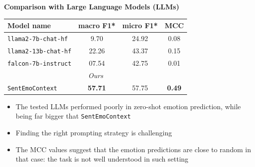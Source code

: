 \documentclass[final,hyperref={pdfpagelabels=false},unknownkeysallowed]{beamer} %
\begin{document}
\begin{frame}
\begin{minipage}{\textwidth}
  \begin{block}{\textbf{Comparison with Large Language Models (LLMs)}}
  \begin{minipage}{0.4\textwidth}
    \vspace{1ex}
    \begin{table}[!ht]
      \centering
      \begin{tabular}{@{}lccc@{}}
      \toprule
      \textbf{Model name}         &\textbf{ macro F1*} & \textbf{micro F1*} & \textbf{MCC} \\ \midrule
      \texttt{llama2-7b-chat-hf}  &  9.70  &  24.92     &  0.08   \\
      \texttt{llama2-13b-chat-hf} &  22.26   &   43.37  &  0.15   \\
      \texttt{falcon-7b-instruct} &  07.54   &  42.75  &  0.01 \\ 
      \midrule
      \multicolumn{4}{c}{\textit{Ours}}\\ \midrule
      \texttt{SentEmoContext}                                          &  \textbf{57.71}       &  57.75            & \textbf{0.49}\\
      \bottomrule
      \end{tabular}
      \end{table}
  \end{minipage}
  \begin{minipage}{0.55\textwidth}
      \begin{itemize}
        \item \enspace The tested LLMs performed poorly in zero-shot emotion prediction, while being far bigger that \texttt{SentEmoContext}
        \item \enspace Finding the right prompting strategy is challenging
        \item \enspace The MCC values suggest that the emotion predictions are close to random in that case: the task is not well understood in such setting
      \end{itemize}
  \end{minipage}
  \vspace{-1ex}
\end{block}
\end{minipage}



\end{frame}
\end{document}
